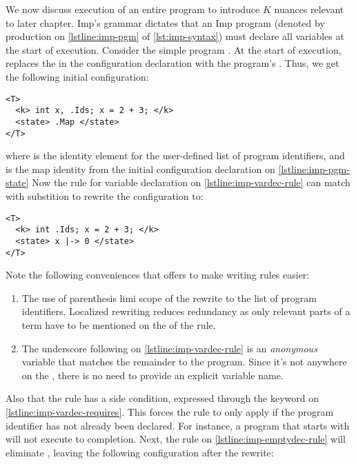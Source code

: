 We now discuss execution of an entire program to introduce $K{}$ nuances
relevant to later chapter. Imp's grammar dictates that an
Imp program (denoted by production  on
\autoref{lstline:imp-pgm} of \autoref{lst:imp-syntax})
must declare all variables at the start of execution. Consider
the simple program .
At the start of execution, \K{} replaces the 
in the configuration declaration with the program's \AST{}.
Thus, we get the following initial configuration:
\begin{lstlisting}[language=k,style=ksty,frame=single]
<T>
  <k> int x, .Ids; x = 2 + 3; </k>
  <state> .Map </state>
</T>
\end{lstlisting}
where  is the identity element for the user-defined
list of program identifiers, and  is the map identity
from the initial configuration declaration on \autoref{lstline:imp-pgm-state}
Now the rule for variable declaration on \autoref{lstline:imp-vardec-rule}
can match with substition 
to rewrite the configuration to:
\begin{lstlisting}[language=k,style=ksty]
<T>
  <k> int .Ids; x = 2 + 3; </k>
  <state> x |-> 0 </state>
</T>
\end{lstlisting}
Note the following conveniences that \K{} offers to make writing rules easier:
\begin{enumerate}[label=\roman*)]
  \item The use of parenthesis limi scope of the rewrite to the
    list of program identifiers. Localized rewriting reduces redundancy
    as only relevant parts of a term have to be mentioned on the \RHS{} of the
    rule.
  \item The underscore \inlinek{_} following 
    on \autoref{lstline:imp-vardec-rule}
    is an \emph{anonymous} variable that matches the remainder to the program.
    Since it's not anywhere on the \RHS{}, there is no need to provide an
    explicit variable name.
\end{enumerate}
Also that the rule has a side condition, expressed through the keyword 
on \autoref{lstline:imp-vardec-requires}. This forces the rule to only apply if
the program identifier has not already been declared. For instance,
a program that starts with  will not execute to completion.
Next, the rule on \autoref{lstline:imp-emptydec-rule} will eliminate
, leaving the following configuration after the rewrite:
